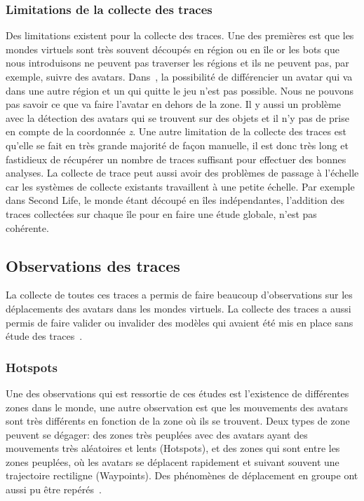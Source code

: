  		\subsubsection{Limitations de la collecte des traces}
	Des limitations existent pour la collecte des traces. Une des premières est que les mondes virtuels sont très souvent découpés en région ou en île or les bots que nous introduisons ne peuvent pas traverser les régions et ils ne peuvent pas, par exemple, suivre des avatars. Dans~\cite{DBLP:journals/corr/abs-0807-2328}, la possibilité de différencier un avatar qui va dans une autre région et un qui quitte le jeu n'est pas possible. Nous ne pouvons pas savoir ce que va faire l'avatar en dehors de la zone. Il y aussi un problème avec la détection des avatars qui se trouvent sur des objets et il n'y pas de prise en compte de la coordonnée \textit{z}. Une autre limitation de la collecte des traces est qu'elle se fait en très grande majorité de façon manuelle, il est donc très long et fastidieux de récupérer un nombre de traces suffisant pour effectuer des bonnes analyses. La collecte de trace peut aussi avoir des problèmes de passage à l'échelle car les systèmes de collecte existants travaillent à une petite échelle. Par exemple dans Second Life, le monde étant découpé en îles indépendantes, l'addition des traces collectées sur chaque île pour en faire une étude globale, n'est pas cohérente.

	\subsection{Observations des traces}
	 La collecte de toutes ces traces a permis de faire beaucoup d'observations sur les déplacements des avatars dans les mondes virtuels. La collecte des traces a aussi permis de faire valider ou invalider des modèles qui avaient été mis en place sans étude des traces~\cite{DBLP:journals/corr/abs-0807-2328}. 
		\subsubsection{Hotspots}
	Une des observations qui est ressortie de ces études est l'existence de différentes zones dans le monde, une autre observation est que les mouvements des avatars sont très différents en fonction de la zone où ils se trouvent. Deux types de zone peuvent se dégager: des zones très peuplées avec des avatars ayant des mouvements très aléatoires et lents (Hotspots), et des zones qui sont entre les zones peuplées, où les avatars se déplacent rapidement et suivant souvent une trajectoire rectiligne (Waypoints). Des phénomènes de déplacement en groupe ont aussi pu être repérés~\cite{15141312}. \\
